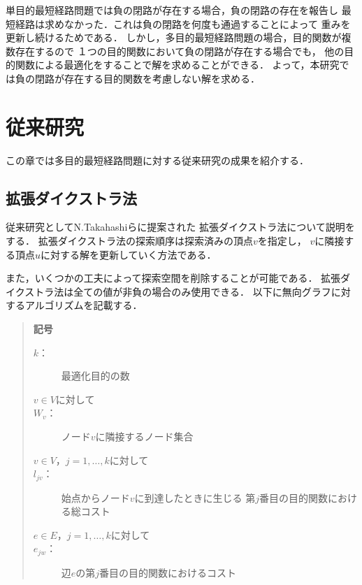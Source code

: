 \documentclass[12pt]{optlab-bachelor}
\begin{document}
単目的最短経路問題では負の閉路が存在する場合，負の閉路の存在を報告し
最短経路は求めなかった．これは負の閉路を何度も通過することによって
重みを更新し続けるためである．
しかし，多目的最短経路問題の場合，目的関数が複数存在するので
１つの目的関数において負の閉路が存在する場合でも，
他の目的関数による最適化をすることで解を求めることができる．
よって，本研究では負の閉路が存在する目的関数を考慮しない解を求める．


\chapter{従来研究}
この章では多目的最短経路問題に対する従来研究の成果を紹介する．

\section{拡張ダイクストラ法}
従来研究としてN.Takahashiら\cite{N.TAKAHASHI1}に提案された
拡張ダイクストラ法について説明をする．
拡張ダイクストラ法の探索順序は探索済みの頂点$v$を指定し，
$v$に隣接する頂点$u$に対する解を更新していく方法である．

また，いくつかの工夫によって探索空間を削除することが可能である．
拡張ダイクストラ法は全ての値が非負の場合のみ使用できる．
以下に無向グラフに対するアルゴリズムを記載する．

\begin{quote}
  \textbf{記号}
  \begin{description}
    \item[$k$：] 最適化目的の数
    \item[$v \in V$に対して]
    \item[$W_v$：] ノード$v$に隣接するノード集合
    \item[$v \in V$，$j = 1 , \ldots , k$に対して]
    \item[$l_{jv}$：] 始点からノード$v$に到達したときに生じる
    第$j$番目の目的関数における総コスト
    \item[$e \in E$，$j = 1 , \ldots , k$に対して]
    \item[$e_{jw}$：] 辺$e$の第$j$番目の目的関数におけるコスト
  \end{description}
\end{quote}
\end{document}
